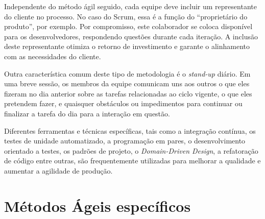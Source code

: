 \par Independente do método ágil seguido, cada equipe deve incluir um representante do cliente no processo. No caso do Scrum, essa é a função do ``proprietário do produto'', por exemplo. Por compromisso, este colaborador se coloca disponível para os desenvolvedores, respondendo questões durante cada iteração. A inclusão deste representante otimiza o retorno de investimento e garante o alinhamento com as necessidades do cliente.
\par Outra característica comum deste tipo de metodologia é o \emph{stand-up} diário. Em uma breve sessão, os membros da equipe comunicam uns aos outros o que eles fizeram no dia anterior sobre as tarefas relacionadas ao ciclo vigente, o que eles pretendem fazer, e quaisquer obstáculos ou impedimentos para continuar ou finalizar a tarefa do dia para a interação em questão.
\par Diferentes ferramentas e técnicas específicas, tais como a integração contínua, os testes de unidade automatizado, a programação em pares, o desenvolvimento orientado a testes, os padrões de projeto, o \emph{Domain-Driven Design}, a refatoração de código entre outras, são frequentemente utilizadas para melhorar a qualidade e aumentar a agilidade de produção.

\section{Métodos Ágeis específicos}

